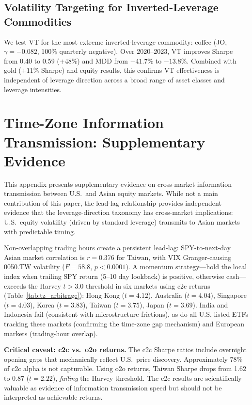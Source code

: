 \subsection{Volatility Targeting for Inverted-Leverage Commodities}

We test VT for the most extreme inverted-leverage commodity: coffee (JO, $\gamma = -0.082$, 100\% quarterly negative). Over 2020--2023, VT improves Sharpe from 0.40 to 0.59 ($+48\%$) and MDD from $-41.7\%$ to $-13.8\%$. Combined with gold ($+11\%$ Sharpe) and equity results, this confirms VT effectiveness is independent of leverage direction across a broad range of asset classes and leverage intensities.

\section{Time-Zone Information Transmission: Supplementary Evidence}
\label{sec:tz_arbitrage}

This appendix presents supplementary evidence on cross-market information transmission between U.S.\ and Asian equity markets. While not a main contribution of this paper, the lead-lag relationship provides independent evidence that the leverage-direction taxonomy has cross-market implications: U.S.\ equity volatility (driven by standard leverage) transmits to Asian markets with predictable timing.

Non-overlapping trading hours create a persistent lead-lag: SPY-to-next-day Asian market correlation is $r = 0.376$ for Taiwan, with VIX Granger-causing 0050.TW volatility ($F = 58.8$, $p < 0.0001$). A momentum strategy---hold the local index when trailing SPY return (5--10 day lookback) is positive, otherwise cash---exceeds the Harvey $t > 3.0$ threshold in six markets using c2c returns (Table~\ref{tab:tz_arbitrage}): Hong Kong ($t = 4.12$), Australia ($t = 4.04$), Singapore ($t = 4.03$), Korea ($t = 3.83$), Taiwan ($t = 3.75$), Japan ($t = 3.69$). India and Indonesia fail (consistent with microstructure frictions), as do all U.S.-listed ETFs tracking these markets (confirming the time-zone gap mechanism) and European markets (trading-hour overlap).

\textbf{Critical caveat: c2c vs.\ o2o returns.} The c2c Sharpe ratios include overnight opening gaps that mechanically reflect U.S.\ price discovery. Approximately 78\% of c2c alpha is not capturable. Using o2o returns, Taiwan Sharpe drops from 1.62 to 0.87 ($t = 2.22$), \textit{failing} the Harvey threshold. The c2c results are scientifically valuable as evidence of information transmission speed but should not be interpreted as achievable returns.

